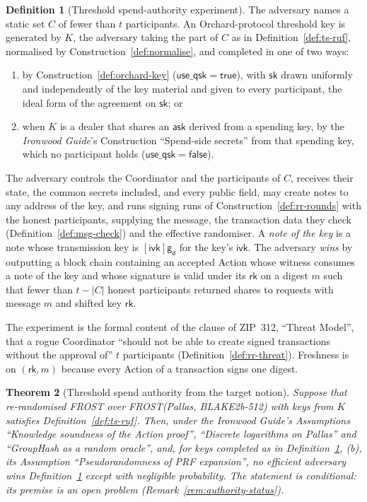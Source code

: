 \documentclass[11pt,a4paper]{article}
\newtheorem{theorem}{Theorem}[section]
\theoremstyle{definition}
\newtheorem{definition}[theorem]{Definition}
\newcommand{\rk}{\mathsf{rk}}
\newcommand{\ask}{\ensuremath{\mathsf{ask}}}
\newcommand{\ivk}{\ensuremath{\mathsf{ivk}}}
\newcommand{\gd}{\ensuremath{\mathsf{g_d}}}
\begin{document}
\begin{definition}[Threshold spend-authority experiment]
\label{def:threshold-authority}
The adversary names a static set \(C\) of fewer than \(t\) participants. An
Orchard-protocol threshold key is generated by \(K\), the adversary taking
the part of \(C\) as in Definition~\ref{def:ts-ruf}, normalised by
Construction~\ref{def:normalise}, and completed in one of two ways:
\begin{enumerate}
\item[(a)] by Construction~\ref{def:orchard-key}
  (\(\mathsf{use\_qsk} = \mathsf{true}\)), with \(\mathsf{sk}\) drawn
  uniformly and independently of the key material and given to every
  participant, the ideal form of the agreement on \(\mathsf{sk}\); or
\item[(b)] when \(K\) is a dealer that shares an \(\ask\) derived from a
  spending key, by the \emph{Ironwood Guide}'s Construction ``Spend-side
  secrets'' from that spending key, which no participant holds
  (\(\mathsf{use\_qsk} = \mathsf{false}\)).
\end{enumerate}
The adversary controls the Coordinator and the participants of \(C\),
receives their state, the common secrets included, and every public field,
may create notes to any address of the key, and runs signing runs of
Construction~\ref{def:rr-rounds} with the honest participants, supplying the
message, the transaction data they check (Definition~\ref{def:msg-check})
and the effective randomiser. A \emph{note of the key} is a note whose
transmission key is \([\ivk]\gd\) for the key's \(\ivk\). The adversary
\emph{wins} by outputting a block chain containing an accepted Action whose
witness consumes a note of the key and whose signature is valid under its
\(\rk\) on a digest \(m\) such that fewer than \(t - \lvert C \rvert\)
honest participants returned shares to requests with message \(m\) and
shifted key \(\rk\).
\end{definition}

The experiment is the formal content of the clause of ZIP~312, ``Threat
Model'', that a rogue Coordinator ``should not be able to create signed
transactions without the approval of'' \(t\) participants
(Definition~\ref{def:rr-threat}). Freshness is on \((\rk, m)\) because every
Action of a transaction signs one digest.

\begin{theorem}[Threshold spend authority from the target notion]
\label{thm:tsa-conditional}
Suppose that re-randomised FROST over FROST(Pallas, BLAKE2b-512) with keys
from \(K\) satisfies Definition~\ref{def:ts-ruf}. Then, under the
\emph{Ironwood Guide}'s Assumptions ``Knowledge soundness of the Action
proof'', ``Discrete logarithms on Pallas'' and ``GroupHash as a random
oracle'', and, for keys completed as in
Definition~\ref{def:threshold-authority}, (b), its Assumption
``Pseudorandomness of PRF expansion'', no efficient adversary wins
Definition~\ref{def:threshold-authority} except with negligible
probability. The statement is conditional: its premise is an open problem
(Remark~\ref{rem:authority-status}).
\end{theorem}
\end{document}
